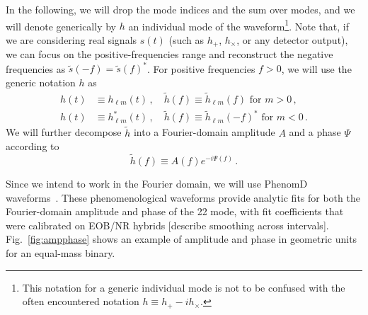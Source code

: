 \documentclass[aps,showpacs,twocolumn,
prd,superscriptaddress,nofootinbib]{revtex4-1}
\newcommand{\be}{\begin{equation}}
\newcommand{\ee}{\end{equation}}
\newcommand{\nn}{\nonumber}
\newcommand{\Hz}{\,\mathrm{Hz}}
\newcommand{\SM}[1]{{\color{Red} #1}}
\begin{document}
In the following, we will drop the mode indices and the sum over modes, and we will denote generically by $h$ an individual mode of the waveform\footnote{This notation for a generic individual mode is not to be confused with the often encountered notation $h\equiv h_{+} - i h_{\times}$.}. Note that, if we are considering real signals $s(t)$ (such as $h_{+}$, $h_{\times}$, or any detector output), we can focus  on the positive-frequencies range and reconstruct the negative frequencies as $\tilde{s}(-f) = \tilde{s}(f)^{*}$. For positive frequencies $f>0$, we will use the generic notation $h$ as
\begin{align}\label{eq:notationhsignm}
	h(t) &\equiv h_{\ell m}(t) \,, \quad \tilde{h}(f) \equiv \tilde{h}_{\ell m}(f) \text{ for } m>0 \,, \nn\\
	h(t) &\equiv h_{\ell m}^{*}(t) \,, \quad \tilde{h}(f) \equiv \tilde{h}_{\ell m}(-f)^{*} \text{ for } m<0 \,.
\end{align}
We will further decompose $\tilde{h}$ into a Fourier-domain amplitude $A$ and a phase $\Psi$ according to
\be\label{eq:defAPsi}
	\tilde{h}(f) \equiv A(f) e^{-i\Psi(f)} \,.
\ee

Since we intend to work in the Fourier domain, we will use PhenomD waveforms~\cite{Khan+15}. These phenomenological waveforms provide analytic fits for both the Fourier-domain amplitude and phase of the 22 mode, with fit coefficients that were calibrated on EOB/NR hybrids [describe smoothing across intervals]. Fig.~\ref{fig:ampphase} shows an example of amplitude and phase in geometric units for an equal-mass binary.

\end{document}
